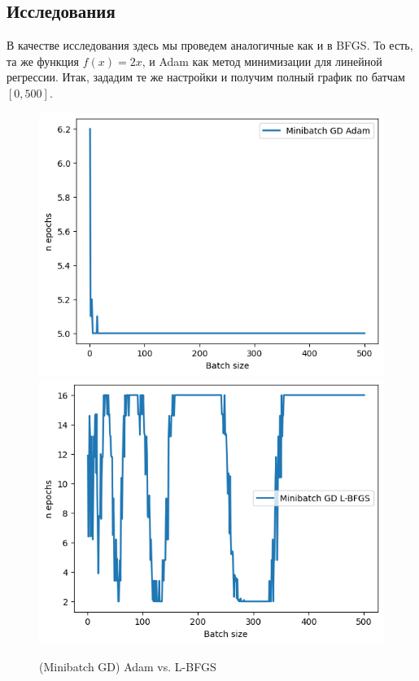 \documentclass[12pt, a4paper, oneside, final]{article}
\begin{document}
	\subsection*{Исследования}
	В качестве исследования здесь мы проведем аналогичные как и в BFGS.
	То есть, та же функция $f(x) = 2x$, и Adam как метод минимизации для линейной регрессии.
	Итак, зададим те же настройки и получим полный график по батчам $[0, 500]$.
	\begin{figure}[H]
		\centering
		\includegraphics[scale = 0.75]{Image/T2_ADAM_GENERAL.png}
		\includegraphics[scale = 0.75]{Image/AT_LBFGS_GENERAL.png}
		\caption*{(Minibatch GD) Adam vs. L-BFGS}
	\end{figure}
\end{document}
